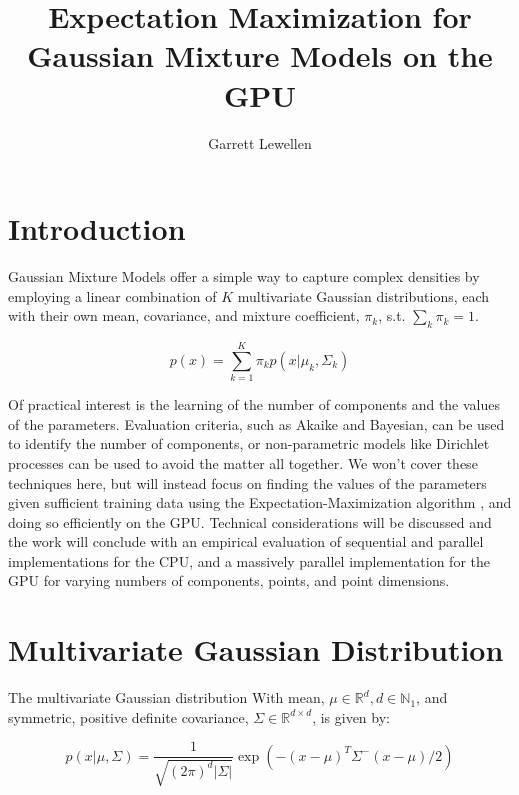 \documentclass{article}
\begin{document}
\author{Garrett Lewellen}
\title{Expectation Maximization for Gaussian Mixture Models on the GPU}

\maketitle

\section{Introduction}

Gaussian Mixture Models \cite[435-439]{bishop2006} offer a simple way to capture complex densities by employing a linear combination of $K$ multivariate Gaussian distributions, each with their own mean, covariance, and mixture coefficient, $\pi_{k}$, s.t. $\sum_{k} \pi_{k} = 1$.

\begin{equation}
	p( x ) = \sum_{k = 1}^{K} \pi_{k} p(x \lvert \mu_k, \Sigma_k)
\end{equation}

Of practical interest is the learning of the number of components and the values of the parameters. Evaluation criteria, such as Akaike and Bayesian, can be used to identify the number of components, or non-parametric models like Dirichlet processes can be used to avoid the matter all together. We won't cover these techniques here, but will instead focus on finding the values of the parameters given sufficient training data using the Expectation-Maximization algorithm \cite{dempster1977maximum}, and doing so efficiently on the GPU. Technical considerations will be discussed and the work will conclude with an empirical evaluation of sequential and parallel implementations for the CPU, and a massively parallel implementation for the GPU for varying numbers of components, points, and point dimensions.

\section{Multivariate Gaussian Distribution}

The multivariate Gaussian distribution With mean, $\mu \in \mathbb{R}^d, d \in \mathbb{N}_1$, and symmetric, positive definite covariance, $\Sigma \in \mathbb{R}^{d \times d}$, is given by:

\begin{equation}
	p( x \lvert \mu, \Sigma ) = \frac{1}{\sqrt{(2\pi)^d \lvert \Sigma \rvert }} \exp{\left( - (x - \mu)^{T} \Sigma^{-} (x - \mu) / 2 \right)}
	\label{eqn:mvn}
\end{equation}
\end{document}
